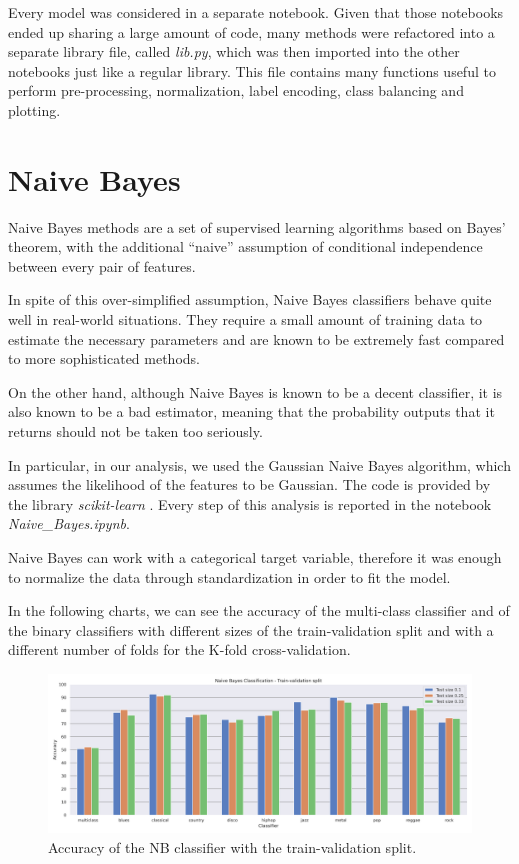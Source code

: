 \documentclass{Configuration_Files/PoliMi3i_thesis}
\begin{document}
Every model was considered in a separate notebook. Given that those notebooks ended up sharing a large amount of code, many methods were refactored into a separate library file, called \textit{lib.py}, which was then imported into the other notebooks just like a regular library. This file contains many functions useful to perform pre-processing, normalization, label encoding, class balancing and plotting.


\section{Naive Bayes}
\label{sec:nb}%
Naive Bayes methods are a set of supervised learning algorithms based on Bayes’ theorem, with the additional “naive” assumption of conditional independence between every pair of features.

In spite of this over-simplified assumption, Naive Bayes classifiers behave quite well in real-world situations. They require a small amount of training data to estimate the necessary parameters and are known to be extremely fast compared to more sophisticated methods.

On the other hand, although Naive Bayes is known to be a decent classifier, it is also known to be a bad estimator, meaning that the probability outputs that it returns should not be taken too seriously.

In particular, in our analysis, we used the Gaussian Naive Bayes algorithm, which assumes the likelihood of the features to be Gaussian. The code is provided by the library \textit{scikit-learn} \cite{scikit-learn}. 
Every step of this analysis is reported in the notebook \textit{Naive\_Bayes.ipynb}.

Naive Bayes can work with a categorical target variable, therefore it was enough to normalize the data through standardization in order to fit the model. 

In the following charts, we can see the accuracy of the multi-class classifier and of the binary classifiers with different sizes of the train-validation split and with a different number of folds for the K-fold cross-validation.

\begin{figure}[H]
    \centering
    \includegraphics[width=\textwidth]{Figures/nb_s.png}
    \caption{Accuracy of the NB classifier with the train-validation split.}
    \label{fig:nbs}
\end{figure}
\end{document}

